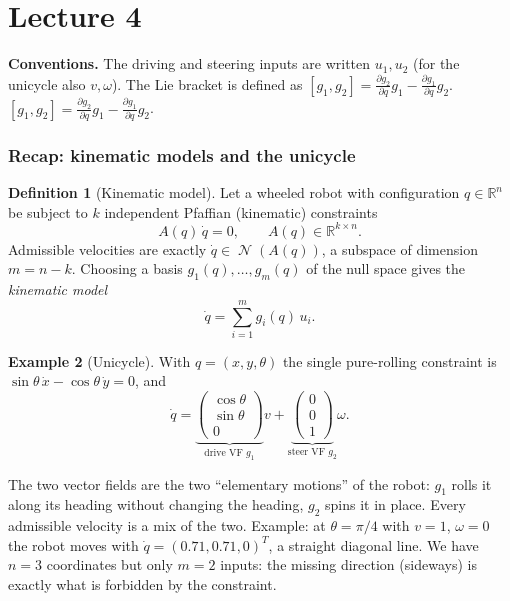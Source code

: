 \documentclass[11pt,a4paper]{article}
\DeclareMathOperator{\Ker}{\mathcal{N}}
\newcommand{\R}{\mathbb{R}}
\newcommand{\LB}[2]{[#1,#2]}
\theoremstyle{definition}
\newtheorem{definition}{Definition}[section]
\newtheorem{example}[definition]{Example}
\theoremstyle{plain}
\theoremstyle{remark}
\begin{document}
\part{Lecture 4}

\noindent\textbf{Conventions.} The driving and steering inputs are written $u_1,u_2$ (for the unicycle also $v,\omega$). The Lie bracket is defined as
$\LB{g_1}{g_2}=\frac{\partial g_2}{\partial q}g_1-\frac{\partial g_1}{\partial q}g_2$.
$\LB{g_1}{g_2}=\frac{\partial g_2}{\partial q}g_1-\frac{\partial g_1}{\partial q}g_2$.

\section{Recap: kinematic models and the unicycle}

\begin{definition}[Kinematic model]
Let a wheeled robot with configuration $q\in\R^n$ be subject to $k$ independent Pfaffian (kinematic) constraints
\[
A(q)\,\dot q=0,\qquad A(q)\in\R^{k\times n}.
\]
Admissible velocities are exactly $\dot q\in\Ker(A(q))$, a subspace of dimension $m=n-k$. Choosing a basis $g_1(q),\dots,g_m(q)$ of the null space gives the \emph{kinematic model}
\[
\dot q=\sum_{i=1}^{m} g_i(q)\,u_i .
\]
\end{definition}

\begin{example}[Unicycle]
With $q=(x,y,\theta)$ the single pure-rolling constraint is $\sin\theta\,\dot x-\cos\theta\,\dot y=0$, and
\[
\dot q=\underbrace{\begin{pmatrix}\cos\theta\\ \sin\theta\\ 0\end{pmatrix}}_{\text{drive VF } g_1}v
+\underbrace{\begin{pmatrix}0\\0\\1\end{pmatrix}}_{\text{steer VF } g_2}\omega .
\]
\end{example}

\begin{intuition}
The two vector fields are the two ``elementary motions'' of the robot: $g_1$ rolls it along its heading without changing the heading, $g_2$ spins it in place. Every admissible velocity is a mix of the two. Example: at $\theta=\pi/4$ with $v=1$, $\omega=0$ the robot moves with $\dot q=(0.71,0.71,0)^T$, a straight diagonal line. We have $n=3$ coordinates but only $m=2$ inputs: the missing direction (sideways) is exactly what is forbidden by the constraint.
\end{intuition}
\end{document}
